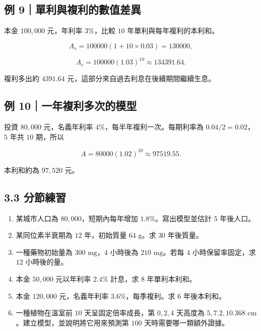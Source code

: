 \documentclass[11pt,a4paper]{article}
\providecommand{\tightlist}{%
  \setlength{\itemsep}{0pt}\setlength{\parskip}{0pt}}
\begin{document}
\subsection{例 9｜單利與複利的數值差異}\label{ux4f8b-9ux55aeux5229ux8207ux8907ux5229ux7684ux6578ux503cux5deeux7570}

本金 \(100{,}000\) 元，年利率 \(3\%\)，比較 \(10\) 年單利與每年複利的本利和。

\[
A_s=100000(1+10\times0.03)=130000,
\]

\[
A_c=100000(1.03)^{10}\approx134391.64.
\]

複利多出約 \(4391.64\) 元，這部分來自過去利息在後續期間繼續生息。

\subsection{例 10｜一年複利多次的模型}\label{ux4f8b-10ux4e00ux5e74ux8907ux5229ux591aux6b21ux7684ux6a21ux578b}

投資 \(80{,}000\) 元，名義年利率 \(4\%\)，每半年複利一次。每期利率為 \(0.04/2=0.02\)，\(5\) 年共 \(10\) 期，所以

\[
A=80000(1.02)^{10}\approx97519.55.
\]

本利和約為 \(97{,}520\) 元。

\subsection{3.3 分節練習}\label{ux5206ux7bc0ux7df4ux7fd2-2}

\begin{enumerate}
\def\labelenumi{\arabic{enumi}.}
\tightlist
\item
  某城市人口為 \(80{,}000\)，短期內每年增加 \(1.8\%\)。寫出模型並估計 \(5\) 年後人口。
\item
  某同位素半衰期為 \(12\) 年，初始質量 \(64\text{ g}\)。求 \(30\) 年後質量。
\item
  一種藥物初始量為 \(300\text{ mg}\)，\(4\) 小時後為 \(210\text{ mg}\)。若每 \(4\) 小時保留率固定，求 \(12\) 小時後的量。
\item
  本金 \(50{,}000\) 元以年利率 \(2.4\%\) 計息，求 \(8\) 年單利本利和。
\item
  本金 \(120{,}000\) 元，名義年利率 \(3.6\%\)，每季複利。求 \(6\) 年後本利和。
\item
  一種植物在溫室前 \(10\) 天呈固定倍率成長，第 \(0,2,4\) 天高度為 \(5,7.2,10.368\text{ cm}\)。建立模型，並說明將它用來預測第 \(100\) 天時需要哪一類額外證據。
\end{enumerate}
\end{document}
